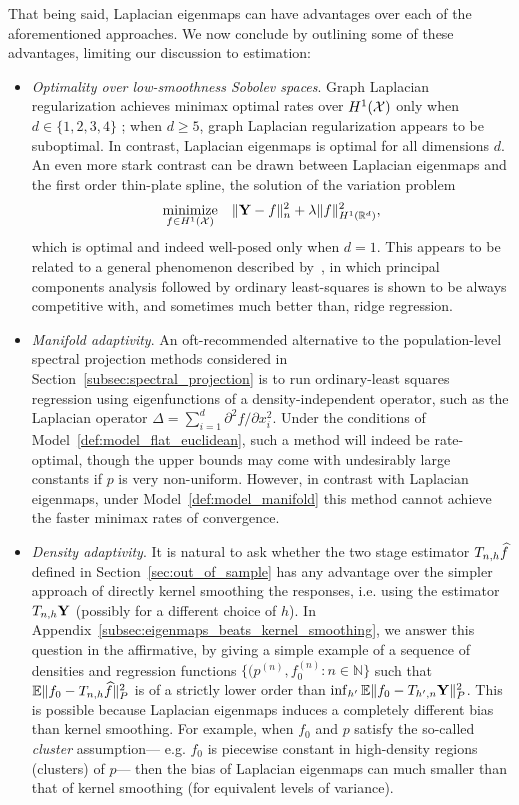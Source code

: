 That being said, Laplacian eigenmaps can have advantages over each of the aforementioned approaches. We now conclude by outlining some of these advantages, limiting our discussion to estimation:
\begin{itemize}
	\item \emph{Optimality over low-smoothness Sobolev spaces}. Graph Laplacian regularization achieves minimax optimal rates over $H^1(\mathcal{X})$ only when $d \in \{1,2,3,4\}$ \citep{sadhanala16, green2021}; when $d \geq 5$, graph Laplacian regularization appears to be suboptimal. In contrast, Laplacian eigenmaps is optimal for all dimensions $d$.  An even more stark contrast can be drawn between Laplacian eigenmaps and the first order thin-plate spline, the solution of the variation problem
	\begin{equation}
	\underset{f \in H^1(\mathcal{X})}{\textrm{minimize}} \quad  \|{\bf Y} - f\|_n^2 + \lambda \|f\|_{H^1(\mathbb{R}^d)}^2,
	\end{equation}
	which is optimal and indeed well-posed only when $d = 1$. This appears to be related to a general phenomenon described by~\cite{dhillon2013,dicker2017}, in which principal components analysis followed by ordinary least-squares is shown to be always competitive with, and sometimes much better than, ridge regression. 
	\item \emph{Manifold adaptivity}. An oft-recommended alternative to the population-level spectral projection methods considered in Section~\ref{subsec:spectral_projection} is to run ordinary-least squares regression using eigenfunctions of a density-independent operator, such as the Laplacian operator $\Delta = \sum_{i = 1}^{d} \partial^2f/\partial x_i^2$. Under the conditions of Model~\ref{def:model_flat_euclidean}, such a method will indeed be rate-optimal, though the upper bounds may come with undesirably large constants if $p$ is very non-uniform. However, in contrast with Laplacian eigenmaps, under Model~\ref{def:model_manifold} this method cannot achieve the faster minimax rates of convergence.
	\item \emph{Density adaptivity}. It is natural to ask whether the two stage estimator $T_{n,h}\widehat{f}$ defined in Section~\ref{sec:out_of_sample} has any advantage over the simpler approach of directly kernel smoothing the responses, i.e. using the estimator $T_{n,h}{\bf Y}$ (possibly for a different choice of $h$). In Appendix~\ref{subsec:eigenmaps_beats_kernel_smoothing}, we answer this question in the affirmative, by giving a simple example of a sequence of densities and regression functions $\{(p^{(n)}, f_0^{(n)}: n \in \mathbb{N}\}$ such that $\mathbb{E}\|f_0 - T_{n,h}\widehat{f}\|_P^2$ is of a strictly lower order than $\inf_{h'} \mathbb{E}\|f_0 - T_{h',n}{\bf Y}\|_P^2$. This is possible because Laplacian eigenmaps induces a completely different bias than kernel smoothing. For example, when $f_0$ and $p$ satisfy the so-called \emph{cluster} assumption--- e.g. $f_0$ is piecewise constant in high-density regions (clusters) of $p$--- then the bias of Laplacian eigenmaps can much smaller than that of kernel smoothing (for equivalent levels of variance). 
	

\end{itemize}
